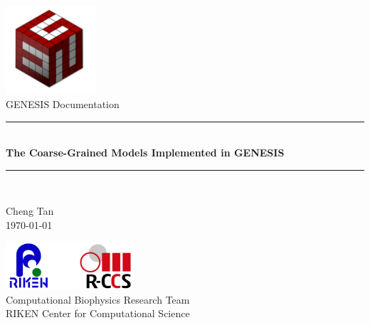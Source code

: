 
\begin{titlepage}
  \thispagestyle{empty}


  \begin{center}

    ~\\[2cm]
    \includegraphics[width=0.25\textwidth]{figures/GENESIS_logo.png}\\[0.5cm]

    \textsf{\Large GENESIS Documentation}\\[0.8cm]

    \rule{\linewidth}{0.8mm} \\[0.3cm]
    {\huge \bfseries The Coarse-Grained Models Implemented in GENESIS\\[0.3cm] }
    \rule{\linewidth}{0.5mm} \\[1.8cm]

    \begin{Large}
      Cheng Tan\\[1em]
      \today
    \end{Large}

    \vfill

    \includegraphics[width=0.36\textwidth]{figures/RIKEN_RCCS_logo.png}\\[0.2cm]

    {\Large
      Computational Biophysics Research Team \\
      RIKEN Center for Computational Science  \\[2em]
    }

  \end{center}

\end{titlepage}

\thispagestyle{empty}

~
\thispagestyle{empty}
\newpage
